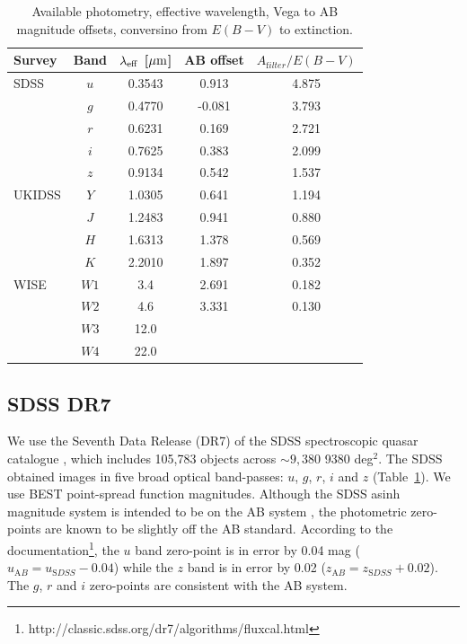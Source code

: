 \begin{table}
  \small
  \centering
  \begin{tabular}{lcccc}
    \hline 
    Survey & Band & $\lambda_{\rm eff}$ [$\mu{\rm m}$] & AB offset & $A_{\mathrm filter}/E(B-V)$ \\
    \hline 
    SDSS & $u$ & 0.3543 &  0.913 & 4.875 \\
         & $g$ & 0.4770 & -0.081 & 3.793 \\
         & $r$ & 0.6231 &  0.169 & 2.721 \\
         & $i$ & 0.7625 &  0.383 & 2.099 \\
         & $z$ & 0.9134 &  0.542 & 1.537 \\
    UKIDSS & $Y$ & 1.0305 &  0.641 & 1.194 \\
           & $J$ & 1.2483 &  0.941 & 0.880 \\
           & $H$ & 1.6313 &  1.378 & 0.569 \\
           & $K$ & 2.2010 &  1.897 & 0.352 \\
    WISE & $W1$ & 3.4 & 2.691 & 0.182\\
         & $W2$ & 4.6 & 3.331 & 0.130\\
         & $W3$ & 12.0 & & \\
         & $W4$ & 22.0 & & \\           
    \hline
  \end{tabular}
  \caption{Available photometry, effective wavelength, Vega to AB magnitude offsets, conversino from $E(B-V)$ to extinction. }
  \label{tab:photometry}
\end{table}

\subsection{SDSS DR7}

We use the Seventh Data Release (DR7) of the \ac{SDSS} spectroscopic quasar catalogue \citep{schneider10}, which includes 105,783 objects across $\sim 9,380$ 9380 deg$^2$. 
The \ac{SDSS} obtained images in five broad optical band-passes: $u$, $g$, $r$, $i$ and $z$ (Table~\ref{tab:photometry}).  
We use BEST point-spread function magnitudes.
Although the SDSS asinh magnitude system is intended to be on the AB system \citep{oke83}, the photometric zero-points are known to be slightly off the AB standard. 
According to the documentation\footnote{http://classic.sdss.org/dr7/algorithms/fluxcal.html}, the $u$ band zero-point is in error by 0.04 mag ($u_{\mathrm AB} = u_{\mathrm SDSS} - 0.04$) while the $z$ band is in error by 0.02 ($z_{\mathrm AB} = z_{\mathrm SDSS} + 0.02$). 
The $g$, $r$ and $i$ zero-points are consistent with the AB system. 

